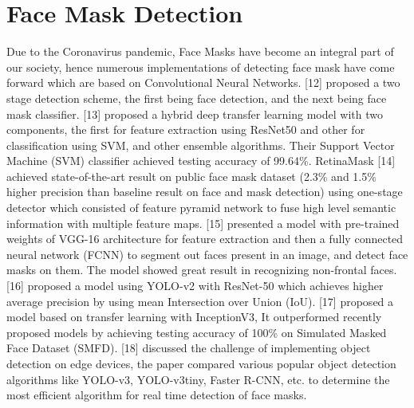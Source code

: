 \documentclass[12pt,a4paper]{article}
\begin{document}
\section{Face Mask Detection}
Due to the Coronavirus pandemic, Face Masks have become an integral part
of our society, hence numerous implementations of detecting face mask have
come forward which are based on Convolutional Neural Networks. [12] proposed a two stage detection scheme, the first being face detection, and the next
being face mask classifier. [13] proposed a hybrid deep transfer learning model
with two components, the first for feature extraction using ResNet50 and other for classification using SVM, and other ensemble algorithms. Their Support Vector Machine (SVM) classifier achieved testing accuracy of 99.64\%. RetinaMask [14] achieved state-of-the-art result on public face mask dataset (2.3\% and 1.5\% higher precision than baseline result on face and mask detection) using one-stage detector which consisted of feature pyramid network to fuse high level semantic information with multiple feature maps. [15] presented a model with pre-trained weights of VGG-16 architecture for feature extraction and then a fully connected neural network (FCNN) to segment out faces present in an image, and detect face
masks on them. The model showed great result in recognizing non-frontal faces.
[16] proposed a model using YOLO-v2 with ResNet-50 which achieves higher
average precision by using mean Intersection over Union (IoU). [17] proposed
a model based on transfer learning with InceptionV3, It outperformed recently
proposed models by achieving testing accuracy of 100\% on Simulated Masked
Face Dataset (SMFD). [18] discussed the challenge of implementing object detection on edge devices, the paper compared various popular object detection
algorithms like YOLO-v3, YOLO-v3tiny, Faster R-CNN, etc. to determine the
most efficient algorithm for real time detection of face masks.
\end{document}
